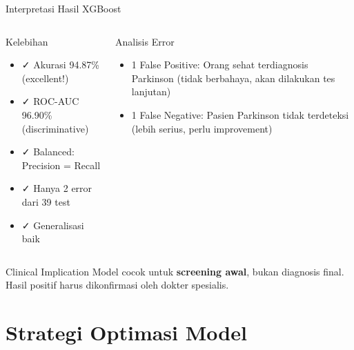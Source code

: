 \documentclass[aspectratio=169]{beamer}
\begin{document}
\begin{frame}{Interpretasi Hasil XGBoost}
\begin{columns}
\begin{block}{Kelebihan}
\begin{itemize}
    \item ✓ Akurasi 94.87\% (excellent!)
    \item ✓ ROC-AUC 96.90\% (discriminative)
    \item ✓ Balanced: Precision = Recall
    \item ✓ Hanya 2 error dari 39 test
    \item ✓ Generalisasi baik
\end{itemize}
\end{block}

\begin{block}{Analisis Error}
\begin{itemize}
    \item 1 False Positive: Orang sehat terdiagnosis Parkinson (tidak berbahaya, akan dilakukan tes lanjutan)
    \item 1 False Negative: Pasien Parkinson tidak terdeteksi (lebih serius, perlu improvement)
\end{itemize}
\end{block}
\end{columns}

\vspace{0.5cm}
\begin{alertblock}{Clinical Implication}
Model cocok untuk \textbf{screening awal}, bukan diagnosis final. Hasil positif harus dikonfirmasi oleh dokter spesialis.
\end{alertblock}
\end{frame}

\section{Strategi Optimasi Model}
\end{document}
